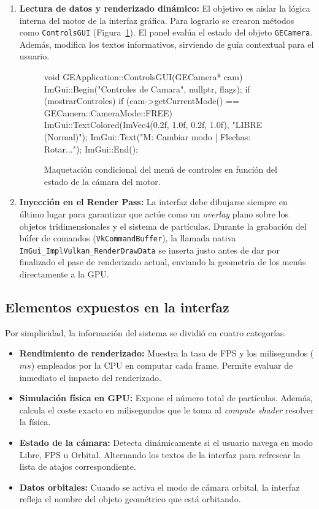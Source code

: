 \begin{enumerate}
    \item \textbf{Lectura de datos y renderizado dinámico:} El objetivo es aislar la lógica interna del motor de la interfaz gráfica. Para lograrlo se crearon métodos como \texttt{ControlsGUI} (Figura~\ref{fig:imgui_controles}). El panel evalúa el estado del objeto \texttt{GECamera}. Además, modifica los textos informativos, sirviendo de guía contextual para el usuario.                           

\begin{figure}[!htbp]
    \centering
\begin{carbonbox}
void GEApplication::ControlsGUI(GECamera* cam) {
    ImGui::Begin("Controles de Camara", nullptr, flags);
    if (mostrarControles) {
        if (cam->getCurrentMode() == GECamera::CameraMode::FREE) {
            ImGui::TextColored(ImVec4(0.2f, 1.0f, 0.2f, 1.0f), "LIBRE (Normal)");
            ImGui::Text("M: Cambiar modo | Flechas: Rotar...");
        }
    }
    ImGui::End();
}
\end{carbonbox}
    \caption{Maquetación condicional del menú de controles en función del estado de la cámara del motor.}
    \label{fig:imgui_controles}
\end{figure}
    \bigskip
    \bigskip
    \item \textbf{Inyección en el Render Pass:} La interfaz debe dibujarse siempre en último lugar para garantizar que actúe como un \textit{overlay} plano sobre los objetos tridimensionales y el sistema de partículas. Durante la grabación del búfer de comandos (\texttt{VkCommandBuffer}), la llamada nativa \texttt{ImGui\_ImplVulkan\_RenderDrawData} se inserta justo antes de dar por finalizado el pase de renderizado actual, enviando la geometría de los menús directamente a la GPU.
\end{enumerate}

\subsection{Elementos expuestos en la interfaz}
\noindent Por simplicidad, la información del sistema se dividió en cuatro categorías.
\begin{itemize}
    \item \textbf{Rendimiento de renderizado:} Muestra la tasa de FPS y los milisegundos ($ms$) empleados por la CPU en computar cada frame. Permite evaluar de inmediato el impacto del renderizado.
    \item \textbf{Simulación física en GPU:} Expone el número total de partículas. Además, calcula el coste exacto en milisegundos que le toma al \textit{compute shader} resolver la física.                           
    \item \textbf{Estado de la cámara:} Detecta dinámicamente si el usuario navega en modo Libre, FPS u Orbital. Alternando los textos de la interfaz para refrescar la lista de atajos correspondiente.
    \item \textbf{Datos orbitales:} Cuando se activa el modo de cámara orbital, la interfaz refleja el nombre del objeto geométrico que está orbitando.
\end{itemize}


